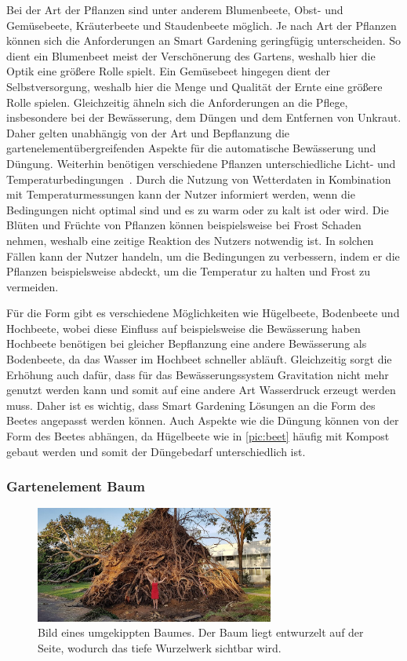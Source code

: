 Bei der Art der Pflanzen sind unter anderem Blumenbeete, Obst- und Gemüsebeete, Kräuterbeete und Staudenbeete möglich.
Je nach Art der Pflanzen können sich die Anforderungen an Smart Gardening geringfügig unterscheiden.
So dient ein Blumenbeet meist der Verschönerung des Gartens, weshalb hier die Optik eine größere Rolle spielt.
Ein Gemüsebeet hingegen dient der Selbstversorgung, weshalb hier die Menge und Qualität der Ernte eine größere Rolle spielen.
Gleichzeitig ähneln sich die Anforderungen an die Pflege, insbesondere bei der Bewässerung, dem Düngen und dem Entfernen von Unkraut.
Daher gelten unabhängig von der Art und Bepflanzung die gartenelementübergreifenden Aspekte für die automatische Bewässerung und Düngung.
Weiterhin benötigen verschiedene Pflanzen unterschiedliche Licht- und Temperaturbedingungen~\cite*{RosenTemperatur}.
Durch die Nutzung von Wetterdaten in Kombination mit Temperaturmessungen kann der Nutzer informiert werden, wenn die Bedingungen nicht optimal sind und es zu warm oder zu kalt ist oder wird.
Die Blüten und Früchte von Pflanzen können beispielsweise bei Frost Schaden nehmen, weshalb eine zeitige Reaktion des Nutzers notwendig ist.
In solchen Fällen kann der Nutzer handeln, um die Bedingungen zu verbessern, indem er die Pflanzen beispielsweise abdeckt, um die Temperatur zu halten und Frost zu vermeiden.

Für die Form gibt es verschiedene Möglichkeiten wie Hügelbeete, Bodenbeete und Hochbeete, wobei diese Einfluss auf beispielsweise die Bewässerung haben
Hochbeete benötigen bei gleicher Bepflanzung eine andere Bewässerung als Bodenbeete, da das Wasser im Hochbeet schneller abläuft.
Gleichzeitig sorgt die Erhöhung auch dafür, dass für das Bewässerungssystem Gravitation nicht mehr genutzt werden kann und somit auf eine andere Art Wasserdruck erzeugt werden muss.
Daher ist es wichtig, dass Smart Gardening Lösungen an die Form des Beetes angepasst werden können.
Auch Aspekte wie die Düngung können von der Form des Beetes abhängen, da Hügelbeete wie in \cref{pic:beet} häufig mit Kompost gebaut werden und somit der Düngebedarf unterschiedlich ist.

\subsubsection{Gartenelement Baum}
\begin{figure}[!htb]
	\centering
	\includegraphics[width=0.7\textwidth]{images/Wurzeln.jpg}
	\caption[Bild eines umgekippten Baumes.]{
		Bild eines umgekippten Baumes.
		Der Baum liegt entwurzelt auf der Seite, wodurch das tiefe Wurzelwerk sichtbar wird.\footnotemark
	}
	\label{pic:baum}
\end{figure}


